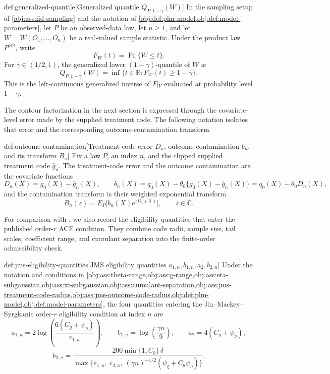 \documentclass[11pt]{article}
\begin{document}
\begin{definitionv}{def:generalized-quantile}[Generalized quantile \(Q_{P,1-\gamma}(W)\)]
In the sampling setup of \cref{obj:ass:iid-sampling} and the notation of \cref{obj:def:plm-model,obj:def:model-parameters}, let \(P\) be an observed-data law, let \(n\ge 1\), and let \(W=W(O_1,\ldots,O_n)\) be a real-valued sample statistic. Under the product law \(P^{\otimes n}\), write
\[
F_W(t)=\Pr\{W\le t\}.
\]
For \(\gamma\in(1/2,1)\), the generalized lower \((1-\gamma)\)-quantile of \(W\) is
\[
Q_{P,1-\gamma}(W)
=
\inf\{t\in\mathbb R:F_W(t)\ge 1-\gamma\}.
\]
This is the left-continuous generalized inverse of \(F_W\) evaluated at probability level \(1-\gamma\).
\end{definitionv}

The contour factorization in the next section is expressed through the covariate-level error made by the supplied treatment code. The following notation isolates that error and the corresponding outcome-contamination transform.

\begin{definitionv}{def:outcome-contamination}[Treatment-code error \(D_n\), outcome contamination \(b_n\), and its transform \(B_n\)]
Fix a law \(P\), an index \(n\), and the clipped supplied treatment code \(\bar g_n\).  The treatment-code error and the outcome contamination are the covariate functions
\[
 D_n(X)=g_0(X)-\bar g_n(X),
 \qquad
 b_n(X)=q_0(X)-\theta_0\{g_0(X)-\bar g_n(X)\}=q_0(X)-\theta_0 D_n(X),
\]
and the contamination transform is their weighted exponential transform
\[
 B_n(z)=E_P\bigl[b_n(X)e^{zD_n(X)}\bigr],\qquad z\in\mathbb C.
\]
\end{definitionv}

For comparison with \citet{JinMackeySyrgkanis2025}, we also record the eligibility quantities that enter the published order-\(r\) ACE condition. They combine code radii, sample size, tail scales, coefficient range, and cumulant separation into the finite-order admissibility check.

\begin{definitionv}{def:jms-eligibility-quantities}[JMS eligibility quantities \(a_{1,n},b_{1,n},a_2,b_{2,n}\)]
Under the notation and conditions in \cref{obj:ass:theta-range,obj:ass:g-range,obj:ass:eta-subgaussian,obj:ass:xi-subgaussian,obj:ass:cumulant-separation,obj:ass:jms-treatment-code-radius,obj:ass:jms-outcome-code-radius,obj:def:plm-model,obj:def:model-parameters}, the four quantities entering the Jin--Mackey--Syrgkanis order-\(r\) eligibility condition at index \(n\) are
\[
 a_{1,n}=2\log\!\left(\frac{6(C_g+\psi_{\eta})}{\varepsilon_{1,n}}\right),
 \qquad
 b_{1,n}=\log\!\left(\frac{\gamma n}{9}\right),
 \qquad
 a_2=4(C_g+\psi_{\eta}),
\]
\[
 b_{2,n}=
 \frac{200\min\{1,C_{\theta}\}\,\delta}
      {\max\bigl\{\varepsilon_{1,n},\ \varepsilon_{2,n},\ (\gamma n)^{-1/2}(\psi_{\xi}+C_{\theta}\psi_{\eta})\bigr\}} .
\]
\end{definitionv}
\end{document}
